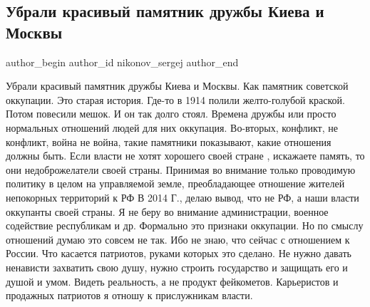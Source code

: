  
 
 
 
 
 
\subsection{Убрали красивый памятник дружбы Киева и Москвы}
\label{sec:07_09_2021.fb.nikonov_sergej.2.pamjatnik_druzhba_kiev_moskva}
 
\ifcmt
 author_begin
   author_id nikonov_sergej
 author_end
\fi

Убрали красивый памятник дружбы Киева и Москвы. Как памятник советской
оккупации. Это старая история. Где-то в 1914 полили желто-голубой краской.
Потом повесили мешок. И он так долго стоял.  Времена дружбы или просто
нормальных отношений людей для них оккупация. Во-вторых, конфликт, не конфликт,
война не война, такие памятники показывают, какие отношения должны быть. Если
власти не хотят хорошего своей стране , искажаете память, то они
недоброжелатели своей страны.  Принимая во внимание только проводимую политику
в целом на управляемой земле, преобладающее отношение жителей непокорных
территорий к РФ В 2014 Г., делаю вывод, что не РФ, а наши власти оккупанты
своей страны. Я не беру во внимание администрации, военное содействие
республикам и др. Формально это  признаки оккупации. Но по смыслу отношений
думаю это совсем не так. Ибо не знаю, что сейчас с отношением к России. Что
касается патриотов, руками которых это сделано. Не нужно давать ненависти
захватить свою душу,  нужно строить государство и защищать его и душой и умом.
Видеть реальность, а не продукт фейкометов.  Карьеристов и продажных патриотов
я отношу к прислужникам власти.
